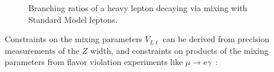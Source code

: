 \begin{figure}[h]
  \centering
  \caption{Branching ratios of a heavy lepton decaying via mixing with Standard Model leptons.}
  \label{fig:resonance-branching-ratios}
\end{figure}

Constraints on the mixing parameters $V_{L\ell}$ can be derived from precision measurements of the $Z$ width, and constraints on products of the mixing parameters from flavor violation experiments like $\mu\rightarrow e\gamma$~\cite{Abada:2008hr,Abada:2007kn,delAguila:2008cv,Altmannshofer:2014ej}:

